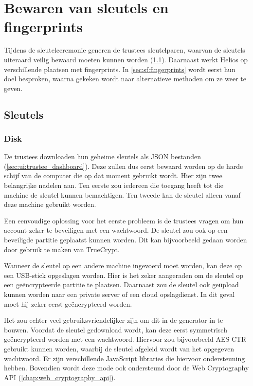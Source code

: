 % 
%

\chapter{Bewaren van sleutels en fingerprints}
\label{chap:sleutels_en_fingerprints}

Tijdens de sleutelceremonie generen de trustees sleutelparen, waarvan de sleutels uiteraard veilig bewaard moeten kunnen worden (\ref{sec:sf:sleutels}). Daarnaast werkt Helios op verschillende plaatsen met fingerprints. In \ref{sec:sf:fingerprints} wordt eerst hun doel besproken, waarna gekeken wordt naar alternatieve methoden om ze weer te geven.

\section{Sleutels}
\label{sec:sf:sleutels}

\subsection{Disk}
\label{sec:sf:disk}

De trustees downloaden hun geheime sleutels als JSON bestanden (\ref{sec:ui:trustee_dashboard}). Deze zullen dus eerst bewaard worden op de harde schijf van de computer die op dat moment gebruikt wordt. Hier zijn twee belangrijke nadelen aan. Ten eerste zou iedereen die toegang heeft tot die machine de sleutel kunnen bemachtigen. Ten tweede kan de sleutel alleen vanaf deze machine gebruikt worden.

\npar Een eenvoudige oplossing voor het eerste probleem is de trustees vragen om hun account zeker te beveiligen met een wachtwoord. De sleutel zou ook op een beveiligde partitie geplaatst kunnen worden. Dit kan bijvoorbeeld gedaan worden door gebruik te maken van TrueCrypt.\cite{site:truecrypt}

\npar Wanneer de sleutel op een andere machine ingevoerd moet worden, kan deze op een USB-stick opgeslagen worden. Hier is het zeker aangeraden om de sleutel op een ge\"encrypteerde partitie te plaatsen. Daarnaast zou de sleutel ook ge\"upload kunnen worden naar een private server of een cloud opslagdienst. In dit geval moet hij zeker eerst ge\"encrypteerd worden.

\npar Het zou echter veel gebruiksvriendelijker zijn om dit in de generator in te bouwen. Voordat de sleutel gedownload wordt, kan deze eerst symmetrisch ge\"encrypteerd worden met een wachtwoord. Hiervoor zou bijvoorbeeld AES-CTR gebruikt kunnen worden, waarbij de sleutel afgeleid wordt van het opgegeven wachtwoord.\cite{rfc2898} Er zijn verschillende JavaScript libraries die hiervoor ondersteuning hebben.\cite{site:github_aes_js}\cite{site:github_sjcl} Bovendien wordt deze mode ook ondersteund door de Web Cryptography API (\ref{chap:web_cryptography_api}).\cite{sleevi_watson_web_cryptography_api}

